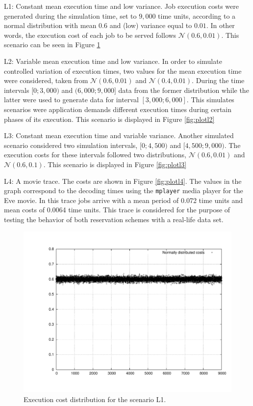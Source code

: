\documentclass[times, 10pt,twocolumn]{article}
\begin{document}
\begin{description}
\item L1: Constant mean execution time and low variance. Job execution
  costs were generated during the simulation time, set to $9,000$ time
  units, according to a normal distribution with mean $0.6$ and (low)
  variance equal to $0.01$. In other words, the execution cost of each
  job to be served follows $\mathcal{N}(0.6,0.01)$. This scenario can
  be seen in Figure \ref{fig:plotl1}
\item L2: Variable mean execution time and low variance.  In order to
  simulate controlled variation of execution times, two values for the
  mean execution time were considered, taken from
  $\mathcal{N}(0.6,0.01)$ and $\mathcal{N}(0.4,0.01)$. During the time
  intervals $[0;3,000)$ and $(6,000;9,000]$ data from the former
  distribution while the latter were used to generate data for
  interval $[3,000;6,000]$. This simulates scenarios were application
  demands different execution times during certain phases of its
  execution. This scenario is displayed in Figure \ref{fig:plotl2}
\item L3: Constant mean execution time and variable variance.  Another
  simulated scenario considered two simulation intervals, $[0;4,500)$
  and $[4,500;9,000)$.  The execution costs for these intervals
  followed two distributions, $\mathcal{N}(0.6,0.01)$ and
  $\mathcal{N}(0.6,0.1)$. This scenario is displayed in Figure
  \ref{fig:plotl3}
\item L4: A movie trace. The costs are shown in Figure
  \ref{fig:plotl4}. The values in the graph correspond to the decoding
  times using the \texttt{mplayer} media player for the Eve movie. In
  this trace jobs arrive with a mean period of 0.072 time units and
  mean costs of 0.0064 time units. This trace is considered for the
  purpose of testing the behavior of both reservation schemes with a
  real-life data set.
\end{description}

\begin{figure}[h!t]
  \centering
  \includegraphics[scale=0.33]{trace-normal}
  \caption{Execution cost distribution for the scenario L1.}
  \label{fig:plotl1}
\end{figure}
\end{document}
